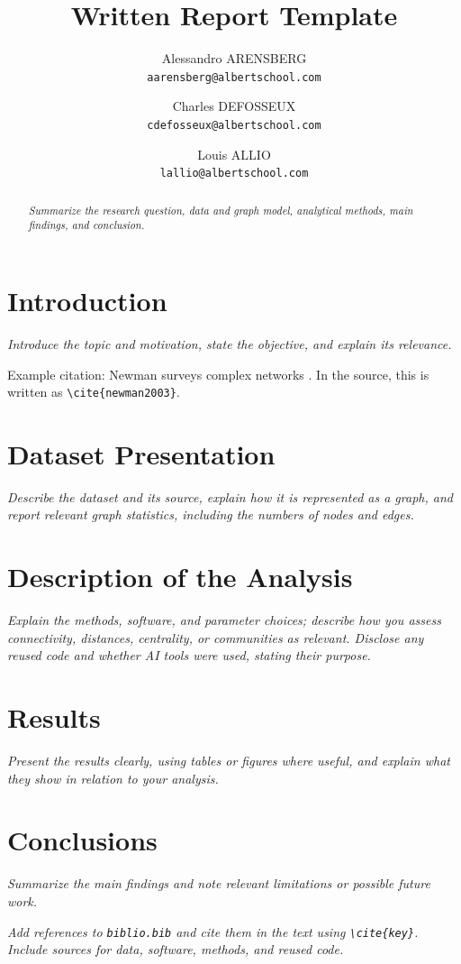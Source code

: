 \documentclass[10pt,a4paper]{article}
\title{Written Report Template}
\author{
  Alessandro ARENSBERG\\
  \texttt{aarensberg@albertschool.com}%
  \and
  Charles DEFOSSEUX\\
  \texttt{cdefosseux@albertschool.com}%
  \and
  Louis ALLIO\\
  \texttt{lallio@albertschool.com}
}
\date{}
\newcommand{\guidance}[1]{\par\smallskip\noindent\textit{#1}\par\smallskip}
\begin{document}
\maketitle

\begin{abstract}
\guidance{Summarize the research question, data and graph model, analytical methods, main findings, and conclusion.}
\end{abstract}

\section{Introduction}
\guidance{Introduce the topic and motivation, state the objective, and explain its relevance.}
\noindent Example citation: Newman surveys complex networks \cite{newman2003}. In the source, this is written as \texttt{\textbackslash cite\{newman2003\}}.


\section{Dataset Presentation}
\guidance{Describe the dataset and its source, explain how it is represented as a graph, and report relevant graph statistics, including the numbers of nodes and edges.}


\section{Description of the Analysis}
\guidance{Explain the methods, software, and parameter choices; describe how you assess connectivity, distances, centrality, or communities as relevant. Disclose any reused code and whether AI tools were used, stating their purpose.}


\section{Results}
\guidance{Present the results clearly, using tables or figures where useful, and explain what they show in relation to your analysis.}


\section{Conclusions}
\guidance{Summarize the main findings and note relevant limitations or possible future work.}


\guidance{Add references to \texttt{biblio.bib} and cite them in the text using \texttt{\textbackslash cite\{key\}}. Include sources for data, software, methods, and reused code.}


\end{document}
